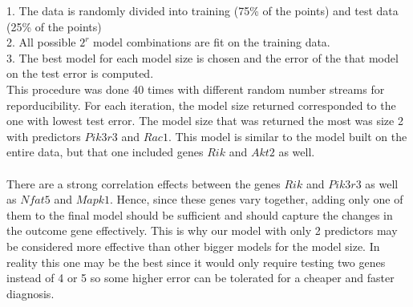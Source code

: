 \documentclass{article}
\begin{document}
1. The data is randomly divided into training (75\% of the points) and test data (25\% of the points)\\
2. All possible $2^r$ model combinations are fit on the training data.\\
3. The best model for each model size is chosen and the error of the that model on the test error is computed. \\

This procedure was done 40 times with different random number streams for reporducibility.  For each iteration, the model size returned corresponded to the one with lowest test error.  The model size that was returned the most was size 2 with predictors $Pik3r3$ and $Rac1$. This model is similar to the model built on the entire data, but that one included genes $Rik$ and $Akt2$ as well.\\
\null\\
There are a strong correlation effects between the genes $Rik$ and $Pik3r3$ as well as $Nfat5$ and $Mapk1$. Hence, since these genes vary together, adding only one of them to the final model should be sufficient and should capture the changes in the outcome gene effectively. This is why our model with only 2 predictors may be considered more effective than other bigger models for the model size.  In reality this one may be the best since it would only require testing two genes instead of 4 or 5 so some higher error can be tolerated for a cheaper and faster diagnosis.
%
\end{document}
